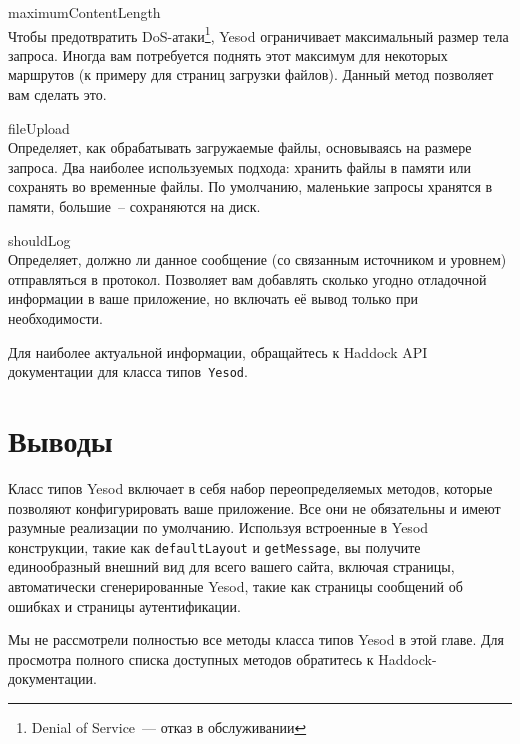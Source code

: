 \begin{description}
    \item {maximumContentLength} \hfill \\
        Чтобы предотвратить DoS-атаки\footnote{Denial of Service~--- отказ в
            обслуживании}, Yesod ограничивает максимальный размер тела запроса.
        Иногда вам потребуется поднять этот максимум для некоторых маршрутов (к
        примеру для страниц загрузки файлов). Данный метод позволяет вам
        сделать это.

    \item {fileUpload} \hfill \\
        Определяет, как обрабатывать загружаемые файлы, основываясь на размере
        запроса. Два наиболее используемых подхода: хранить файлы в памяти
        или сохранять во временные файлы. По умолчанию, маленькие запросы
        хранятся в памяти, большие~-- сохраняются на диск.

    \item {shouldLog} \hfill \\
        Определяет, должно ли данное сообщение (со связанным источником и
        уровнем) отправляться в протокол. Позволяет вам добавлять сколько
        угодно отладочной информации в ваше приложение, но включать её вывод
        только при необходимости.
\end{description}

Для наиболее актуальной информации, обращайтесь к Haddock API документации для
класса типов~\lstinline!Yesod!.

\section {Выводы}

Класс типов Yesod включает в себя набор переопределяемых методов, которые
позволяют конфигурировать ваше приложение. Все они не обязательны и имеют
разумные реализации по умолчанию. Используя встроенные в Yesod конструкции,
такие как \lstinline!defaultLayout! и \lstinline!getMessage!, вы получите
единообразный внешний вид для всего вашего сайта, включая страницы,
автоматически сгенерированные Yesod, такие как страницы сообщений об ошибках и
страницы аутентификации.

Мы не рассмотрели полностью все методы класса типов Yesod в этой главе. Для
просмотра полного списка доступных методов обратитесь к Haddock-документации.
